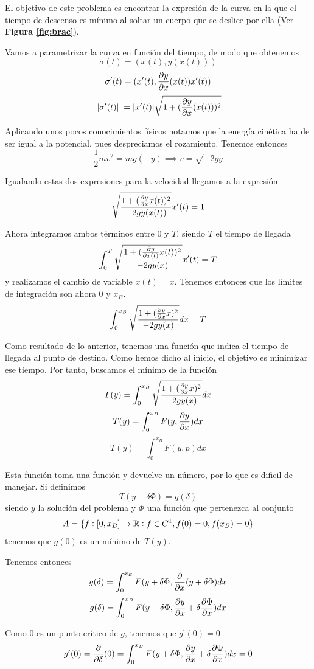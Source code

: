 \documentclass{mathnotes}
\begin{document}

\begin{example}[(Braquistocrona I)]
El objetivo de este problema es encontrar la expresión de la curva en la que el tiempo de descenso es mínimo al soltar un cuerpo que se deslice por ella (Ver \textbf{Figura \ref{fig:brac}}).

Vamos a parametrizar la curva en función del tiempo, de modo que obtenemos
$$\sigma(t) = (x(t),y(x(t)))$$
$$\sigma^\prime(t) = (x^\prime(t), \partialder{x}{y}(x(t))x^\prime(t))$$
$$\norm{\sigma^\prime(t)} = \abs{x^\prime(t)}\sqrt{1+(\partialder{x}{y}(x(t)))^2}$$


Aplicando unos pocos conocimientos físicos notamos que la energía cinética ha de ser igual a la potencial, pues despreciamos el rozamiento. Tenemos entonces
$$\frac{1}{2}mv^2 = mg(-y) \implies v = \sqrt{-2gy}$$

Igualando estas dos expresiones para la velocidad llegamos a la expresión
$$\sqrt{\frac{1+(\partialder{x}{y}x(t))^2}{-2gy(x(t))}}x^\prime(t) = 1$$

Ahora integramos ambos términos entre $0$ y $T$, siendo $T$ el tiempo de llegada
$$\int_0^{T}\sqrt{\frac{1+(\partialder{x(t)}{y}x(t))^2}{-2gy(x)}}x^\prime(t) = T$$
y realizamos el cambio de variable $x(t) = x$. Tenemos entonces que los límites de integración son ahora $0$ y $x_B$.
$$\int_0^{x_B}\sqrt{\frac{1+(\partialder{x}{y}x)^2}{-2gy(x)}}dx = T$$

Como resultado de lo anterior, tenemos una función que indica el tiempo de llegada al punto de destino.
Como hemos dicho al inicio, el objetivo es minimizar ese tiempo. Por tanto, buscamos el mínimo de la función
$$T(y) = \int_0^{x_B}\sqrt{\frac{1+(\partialder{x}{y}x)^2}{-2gy(x)}}dx$$
$$T(y) = \int_0^{x_B} F(y, \partialder{x}{y})dx$$
$$T(y) = \int_0^{x_B} F(y, p)dx$$

Esta función toma una función y devuelve un número, por lo que es dificil de manejar. Si definimos
$$T(y+\delta\Phi) = g(\delta)$$
siendo $y$ la solución del problema y $\Phi$ una función que pertenezca al conjunto 
$$A = \set{f:[0,x_B] \to \R \st f\in C^1, f(0) = 0, f(x_B) = 0}$$
tenemos que $g(0)$ es un mínimo de $T(y)$.

Tenemos entonces $$g(\delta) = \int_0^{x_B} F(y+\delta\Phi, \derivative{x}(y+\delta\Phi)dx$$
$$g(\delta) = \int_0^{x_B} F(y+\delta\Phi, \partialder{x}{y} + \delta\partialder{x}{\Phi})dx$$

Como $0$ es un punto crítico de $g$, tenemos que $g^\prime(0) = 0$
$$g^\prime(0) = \derivative{\delta}(0) = \int_0^{x_B} F(y+\delta\Phi, \partialder{x}{y} + \delta\partialder{x}{\Phi})dx = 0$$


\end{example}
\end{document}
